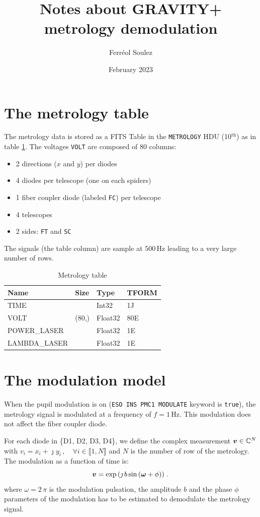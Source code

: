 \documentclass[a4paper,11pt,twoside]{scrartcl}
\title{Notes about GRAVITY+ metrology demodulation}
\author{Ferréol Soulez }
\date{February 2023}
\begin{document}
\maketitle

\section{The metrology table}
The metrology data is stored as a FITS Table in the \verb+METROLOGY+ HDU (10$^\textrm{th}$) as in table \ref{tab:table}. The voltages \verb+VOLT+ are composed of $80$ columns:
\begin{itemize}
    \item 2 directions ($x$ and  $y$) per diodes
    \item 4 diodes per telescope (one on each spiders)
    \item 1 fiber coupler diode (labeled \verb+FC+) per telescope
    \item 4 telescopes
    \item 2 sides: \verb|FT|  and \verb|SC|
\end{itemize}
The signals (the table column) are sample at $500\,$Hz leading to a very large number of rows. 
\begin{table}[]
    \centering
    \begin{tabular}{l| l ll}
Name   &       Size  & Type  &   TFORM   \\
\hline
TIME   &              & Int32  &  1J     \\
VOLT   &       (80,) & Float32 &  80E    \\
POWER\_LASER   &    &   Float32 & 1E     \\
LAMBDA\_LASER   &    &  Float32 & 1E     
    \end{tabular}
    \caption{Metrology table}
    \label{tab:table}
\end{table}

\section{The modulation model}

When the pupil modulation is on (\verb|ESO INS PMC1 MODULATE| keyword is \verb|true|), the metrology signal is modulated at a frequency of $f=1\,$Hz. 
This modulation does not affect the fiber coupler diode.

For each diode in \{D1, D2, D3, D4\}, we define the complex measurement $\boldsymbol{v} \in \mathbb{C}^N$  with $v_i =   x_i + \jmath y_i \,, \quad \forall i \in \llbracket 1,N \rrbracket $ and  $N$ is the number of row of the metrology. The modulation as a function of time is:
\begin{equation}
    \boldsymbol{v} = \exp\left( \jmath \, b \sin\left( \boldsymbol{\omega} + \phi\right)\right)\,.\label{eq:v}
\end{equation}
where $\omega = 2\,\pi$ is the modulation pulsation, the amplitude $b$  and the phase $\phi$ parameters of the modulation has to be estimated to demodulate the metrology signal.
\end{document}
